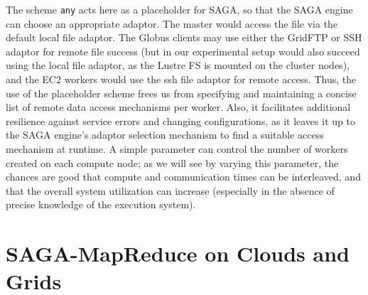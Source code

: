 \documentclass[conference,final]{IEEEtran}
\newcommand{\jhanote}[1]{ {\textcolor{red} { ***SJ: #1 }}}
\newcommand{\jhanote}[1]{}
\newcommand{\T}[1]{\texttt{#1}}
\begin{document}
The scheme \T{any} acts here as a placeholder for SAGA, so that the
SAGA engine can choose an appropriate adaptor.  The master would
access the file via the default local file adaptor.  The Globus
clients may use either the GridFTP or SSH adaptor for remote file
success (but in our experimental setup would also succeed 
using the local file adaptor, as the Lustre FS is mounted on the
cluster nodes), and the EC2 workers would use the ssh file adaptor for
remote access.  Thus, the use of the placeholder scheme frees us from
specifying and maintaining a concise list of remote data access
mechanisms per worker.  Also, it facilitates additional resilience
against service errors and changing configurations, as it leaves it up
to the SAGA engine's adaptor selection mechanism to find a suitable
access mechanism at runtime.
A simple parameter can control the number of workers created on each
compute node; as we will see by varying this parameter, the chances
are good that compute and communication times can be interleaved, and
that the overall system utilization can increase (especially in the
absence of precise knowledge of the execution system).
 
\section{SAGA-MapReduce on Clouds and Grids}


\end{document}
